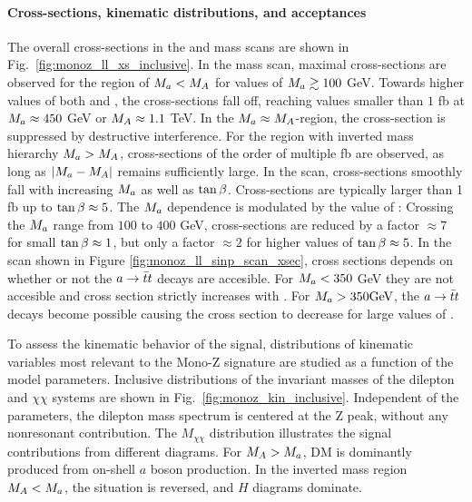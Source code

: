 \paragraph{Cross-sections, kinematic distributions, and acceptances}
The overall cross-sections in the \tanb and mass scans are shown in Fig.~\ref{fig:monoz_ll_xs_inclusive}.
In the mass scan, maximal cross-sections are observed for the region of $M_{a} < M_{A}$ for values of $M_{a}\gtrsim100$ GeV. Towards higher values of both \ma and \mA, the cross-sections fall off, reaching values smaller than $1$ fb at $M_{a}\approx450$ GeV or $M_{A}\approx1.1$ TeV. In the $M_{a}\approx M_{A}$-region, the cross-section is suppressed by destructive interference. For the region with inverted mass hierarchy $M_{a}>M_{A}$, cross-sections of the order of multiple fb are observed, as long as $|M_{a}-M_{A}|$ remains sufficiently large.
In the \tanb scan, cross-sections smoothly fall with increasing $M_{a}$ as well as $\tan\beta$. Cross-sections are typically larger than 1 fb up to $\tan\beta\approx5$. The $M_{a}$ dependence is modulated by the value of \tanb: Crossing the $M_{a}$ range from $100$ to $400$ GeV, cross-sections are reduced by a factor $\approx7$ for small $\tan\beta\approx1$, but only a factor $\approx2$ for higher values of $\tan\beta\approx5$.
In the \sinp scan shown in Figure \ref{fig:monoz_ll_sinp_scan_xsec}, cross sections depends on whether or not the $a \rightarrow \bar{t}t$ decays are accesible.  
For $M_{a} < 350$ GeV they are not accesible and cross section strictly increases with \sinp.  For $M_{a} > 350 \textrm{GeV}$, the $a \rightarrow \bar{t}t$ decays become possible causing the cross section to decrease for large values of \sinp.


To assess the kinematic behavior of the signal, distributions of kinematic variables most relevant to the Mono-Z signature are studied as a function of the model parameters.  Inclusive distributions of the invariant masses of the dilepton and $\chi\chi$ systems are shown in Fig.~\ref{fig:monoz_kin_inclusive}. Independent of the parameters, the dilepton mass spectrum is centered at the Z peak, without any nonresonant contribution. The $M_{\chi\chi}$ distribution illustrates the signal contributions from different diagrams. For $M_{A}>M_{a}$, DM is dominantly produced from on-shell $a$ boson production. In the inverted mass region $M_{A}<M_{a}$, the situation is reversed, and $H$ diagrams dominate.


